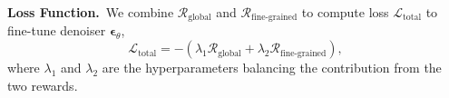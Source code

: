 
\textbf{Loss Function.}~We combine $\mathcal{R}_\textrm{global}$ and $\mathcal{R}_{\textrm{fine-grained}}$ to compute loss $\mathcal{L}_{\textrm{total}}$ to fine-tune denoiser $\boldsymbol{\epsilon}_\theta$,
\begin{equation}
    \mathcal{L}_{\textrm{total}} = -(\lambda_1 \mathcal{R}_\textrm{global} +\lambda_2 \mathcal{R}_\textrm{fine-grained}),
\end{equation}
where $\lambda_1$ and $\lambda_2$ are the hyperparameters balancing the contribution from the two rewards.

